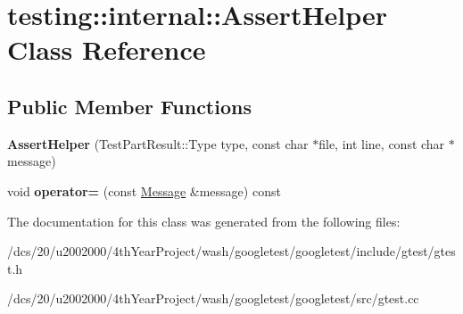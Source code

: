 \hypertarget{classtesting_1_1internal_1_1AssertHelper}{}\section{testing\+:\+:internal\+:\+:Assert\+Helper Class Reference}
\label{classtesting_1_1internal_1_1AssertHelper}
\subsection*{Public Member Functions}
\begin{DoxyCompactItemize}
\item 
\mbox{\label{classtesting_1_1internal_1_1AssertHelper_ac2c9334518fd4087189b4505567a3c90}} 
{\bfseries Assert\+Helper} (Test\+Part\+Result\+::\+Type type, const char $\ast$file, int line, const char $\ast$message)
\item 
\mbox{\label{classtesting_1_1internal_1_1AssertHelper_a97bf22d786131ab7baa86b97a27aeb4d}} 
void {\bfseries operator=} (const \mbox{\hyperlink{classtesting_1_1Message}{Message}} \&message) const
\end{DoxyCompactItemize}


The documentation for this class was generated from the following files\+:\begin{DoxyCompactItemize}
\item 
/dcs/20/u2002000/4th\+Year\+Project/wash/googletest/googletest/include/gtest/gtest.\+h\item 
/dcs/20/u2002000/4th\+Year\+Project/wash/googletest/googletest/src/gtest.\+cc\end{DoxyCompactItemize}
